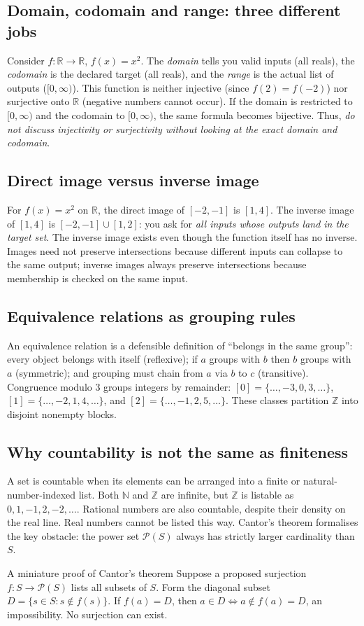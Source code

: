\documentclass[11pt,a4paper]{article}
\newcommand{\R}{\mathbb R}\newcommand{\N}{\mathbb N}\newcommand{\Z}{\mathbb Z}\newcommand{\Q}{\mathbb Q}\newcommand{\Pow}{\mathcal P}\newcommand{\dd}{\mathrm d}\newcommand{\im}{\operatorname{Ran}}\newcommand{\id}{\operatorname{id}}
\begin{document}
\subsection{Domain, codomain and range: three different jobs}
Consider $f:\R\to\R$, $f(x)=x^2$. The \emph{domain} tells you valid inputs (all reals), the \emph{codomain} is the declared target (all reals), and the \emph{range} is the actual list of outputs ($[0,\infty)$). This function is neither injective (since $f(2)=f(-2)$) nor surjective onto $\R$ (negative numbers cannot occur). If the domain is restricted to $[0,\infty)$ and the codomain to $[0,\infty)$, the same formula becomes bijective. Thus, \emph{do not discuss injectivity or surjectivity without looking at the exact domain and codomain}.
\subsection{Direct image versus inverse image}
For $f(x)=x^2$ on $\R$, the direct image of $[-2,-1]$ is $[1,4]$. The inverse image of $[1,4]$ is $[-2,-1]\cup[1,2]$: you ask for \emph{all inputs whose outputs land in the target set}. The inverse image exists even though the function itself has no inverse. Images need not preserve intersections because different inputs can collapse to the same output; inverse images always preserve intersections because membership is checked on the same input.
\subsection{Equivalence relations as grouping rules}
An equivalence relation is a defensible definition of ``belongs in the same group'': every object belongs with itself (reflexive); if $a$ groups with $b$ then $b$ groups with $a$ (symmetric); and grouping must chain from $a$ via $b$ to $c$ (transitive). Congruence modulo $3$ groups integers by remainder: $[0]=\{\ldots,-3,0,3,\ldots\}$, $[1]=\{\ldots,-2,1,4,\ldots\}$, and $[2]=\{\ldots,-1,2,5,\ldots\}$. These classes partition $\Z$ into disjoint nonempty blocks.
\subsection{Why countability is not the same as finiteness}
A set is countable when its elements can be arranged into a finite or natural-number-indexed list. Both $\N$ and $\Z$ are infinite, but $\Z$ is listable as $0,1,-1,2,-2,\ldots$. Rational numbers are also countable, despite their density on the real line. Real numbers cannot be listed this way. Cantor's theorem formalises the key obstacle: the power set $\Pow(S)$ always has strictly larger cardinality than $S$.
\begin{keybox}{A miniature proof of Cantor's theorem}
Suppose a proposed surjection $f:S\to\Pow(S)$ lists all subsets of $S$. Form the diagonal subset $D=\{s\in S:s\notin f(s)\}$. If $f(a)=D$, then $a\in D\iff a\notin f(a)=D$, an impossibility. No surjection can exist.\end{keybox}
\end{document}
